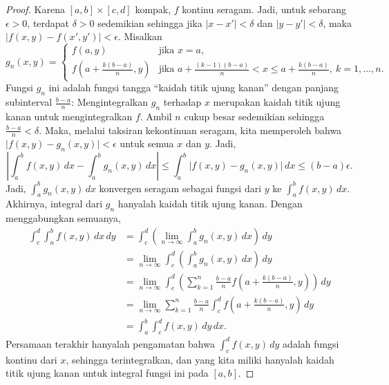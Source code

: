 \documentclass[12pt,openany]{book}
\newcommand{\sabs}[1]{\lvert {#1} \rvert}
\newcommand{\babs}[1]{\bigl\lvert {#1} \bigr\rvert}
\newcommand{\abs}[1]{\left\lvert {#1} \right\rvert}
\newcommand{\myquote}[1]{``#1''}
\theoremstyle{plain}
\theoremstyle{remark}
\theoremstyle{definition}
\theoremstyle{exercise}
\theoremstyle{example}
\begin{document}
\begin{proof}
Karena $[a,b] \times [c,d]$ kompak, $f$ kontinu seragam.
Jadi, untuk
sebarang $\epsilon > 0$, terdapat $\delta > 0$ sedemikian sehingga jika
$\sabs{x-x'} < \delta$ dan 
$\sabs{y-y'} < \delta$, maka $\sabs{f(x,y) -f(x',y')} < \epsilon$.
Misalkan
\begin{equation*}
g_n(x,y)
=
\begin{cases}
f(a,y) & \text{jika } x=a ,
\\
f\left(a+\frac{k(b-a)}{n},y\right)
& \text{jika } a+\frac{(k-1)(b-a)}{n} < x \leq a+\frac{k(b-a)}{n} , ~
k=1,\ldots,n.
\end{cases}
\end{equation*}
Fungsi $g_n$ ini adalah fungsi tangga \myquote{kaidah titik ujung kanan} dengan
panjang subinterval $\frac{b-a}{n}$:
Mengintegralkan $g_n$ terhadap $x$ merupakan kaidah titik ujung kanan untuk mengintegralkan $f$.
Ambil $n$ cukup besar sedemikian sehingga $\frac{b-a}{n} < \delta$.  Maka,
melalui taksiran kekontinuan seragam, kita memperoleh bahwa $\babs{f(x,y)-g_n(x,y)} < \epsilon$
untuk semua $x$ dan $y$. Jadi,
\begin{equation*}
\abs{
\int_a^b
f(x,y)
\, dx
-
\int_a^b
g_n(x,y)
\, dx
}
\leq
\int_a^b
\babs{
f(x,y)
-
g_n(x,y)
}
\, dx
\leq (b-a)\epsilon .
\end{equation*}
Jadi, $\int_a^b g_n(x,y) \, dx$ konvergen seragam sebagai fungsi dari $y$ ke
$\int_a^b f(x,y) \, dx$.  Akhirnya, integral dari $g_n$ hanyalah
kaidah titik ujung kanan.  Dengan menggabungkan semuanya,
\begin{equation*}
\begin{split}
\int_c^d \int_a^b f(x,y) \, dx \, dy
& =
\int_c^d
\left(
\lim_{n \to \infty}
\int_a^b g_n(x,y) \, dx
\right) \, dy
\\
& =
\lim_{n \to \infty}
\int_c^d
\left(
\int_a^b g_n(x,y) \, dx
\right) \, dy
\\
& =
\lim_{n \to \infty}
\int_c^d
\left(
\sum_{k=1}^n
\frac{b-a}{n} f\left(a+\frac{k(b-a)}{n},y\right)
\right) \, dy
\\
& =
\lim_{n \to \infty}
\sum_{k=1}^n
\frac{b-a}{n} 
\int_c^d
f\left(a+\frac{k(b-a)}{n},y\right)
\, dy
\\
& =
\int_a^b
\int_c^d
f(x,y)
\, dy \, dx .
\end{split}
\end{equation*}
Persamaan terakhir hanyalah pengamatan bahwa  
$\int_c^d
f(x,y)
\, dy$ adalah fungsi kontinu dari $x$, sehingga terintegralkan, dan yang kita miliki
hanyalah kaidah titik ujung kanan untuk integral fungsi ini pada $[a,b]$.
\end{proof}
\end{document}
